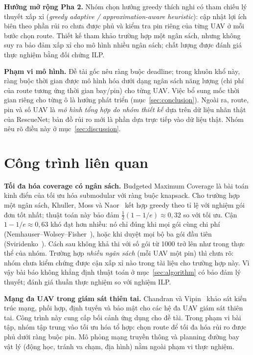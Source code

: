 \documentclass[conference]{IEEEtran}
\begin{document}
\textbf{Hướng mở rộng Pha 2.} Nhóm chọn hướng greedy thích nghi có tham chiếu lý thuyết
xấp xỉ (\emph{greedy adaptive / approximation-aware heuristic}): cập nhật lợi ích biên
theo phần rủi ro chưa được phủ và kiểm tra pin riêng của từng UAV ở mỗi bước chọn route.
Thiết kế tham khảo trường hợp một ngân sách, nhưng không suy ra bảo đảm xấp xỉ cho mô hình
nhiều ngân sách; chất lượng được đánh giá thực nghiệm bằng đối chứng ILP.

\textbf{Phạm vi mô hình.} Đề tài gốc nêu ràng buộc deadline; trong khuôn khổ này, ràng buộc
thời gian được mô hình hóa dưới dạng ngân sách năng lượng (chi phí của route tương ứng thời
gian bay/pin) cho từng UAV. Việc bổ sung mốc thời gian riêng cho từng ô là hướng phát triển
(mục~\ref{sec:conclusion}). Ngoài ra, route, pin và số UAV là \emph{mô hình tổng hợp do nhóm
thiết kế} dựa trên dữ liệu nhãn thật của RescueNet; bản đồ rủi ro mới là phần dựa trực tiếp
vào dữ liệu thật. Nhóm nêu rõ điều này ở mục~\ref{sec:discussion}.

\section{Công trình liên quan}
\textbf{Tối đa hóa coverage có ngân sách.} Budgeted Maximum Coverage là bài toán kinh điển
của tối ưu hóa submodular với ràng buộc knapsack. Cho trường hợp một ngân sách, Khuller, Moss
và Naor~\cite{khuller1999} kết hợp greedy theo tỉ lệ với nghiệm gói đơn tốt nhất; thuật toán
này bảo đảm $\tfrac{1}{2}(1-1/e) \approx 0{,}32$ so với tối ưu. Cận $1-1/e \approx 0{,}63$
khó đạt hơn nhiều: nó chỉ đúng khi mọi gói cùng chi phí
(Nemhauser--Wolsey--Fisher~\cite{nemhauser1978}), hoặc khi duyệt mọi bộ ba gói đầu tiên
(Sviridenko~\cite{sviridenko2004}). Cách sau không khả thi với số gói từ 1000 trở lên như
trong thực thể của nhóm. Trường hợp \emph{nhiều ngân sách} (mỗi UAV một pin) thì chưa rõ:
nhóm chưa kiểm chứng được cận xấp xỉ nào trong tài liệu cho trường hợp này. Vì vậy bài báo
không khẳng định thuật toán ở mục~\ref{sec:algorithm} có bảo đảm lý thuyết; đánh giá thuần
thực nghiệm so với nghiệm ILP.

\textbf{Mạng đa UAV trong giám sát thiên tai.} Chandran và Vipin~\cite{chandran2024}
khảo sát kiến trúc mạng, phối hợp, định tuyến và bảo mật cho các hệ đa UAV giám sát thiên
tai. Công trình này cung cấp bối cảnh ứng dụng cho đề tài. Trong phạm vi bài tập, nhóm
tập trung vào tối ưu hóa tổ hợp: chọn route để tối đa hóa rủi ro được phủ dưới ràng buộc
pin. Mô phỏng mạng truyền thông và planning đường bay vật lý (động học, tránh va chạm,
địa hình) nằm ngoài phạm vi thực nghiệm.
\end{document}
